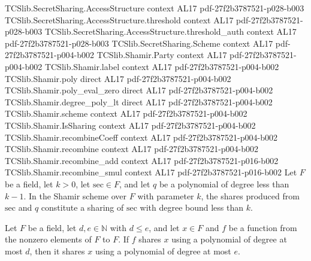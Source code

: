 \begin{theorem}
\label{TCSlib.Shamir.isSharing_share}
\leanok
\proofstep
  {TCSlib.SecretSharing.AccessStructure}
  {context}
  {AL17}
  {pdf-27f2b3787521-p028-b003}
\proofstep
  {TCSlib.SecretSharing.AccessStructure.threshold}
  {context}
  {AL17}
  {pdf-27f2b3787521-p028-b003}
\proofstep
  {TCSlib.SecretSharing.AccessStructure.threshold_auth}
  {context}
  {AL17}
  {pdf-27f2b3787521-p028-b003}
\proofstep
  {TCSlib.SecretSharing.Scheme}
  {context}
  {AL17}
  {pdf-27f2b3787521-p004-b002}
\proofstep
  {TCSlib.Shamir.Party}
  {context}
  {AL17}
  {pdf-27f2b3787521-p004-b002}
\proofstep
  {TCSlib.Shamir.label}
  {context}
  {AL17}
  {pdf-27f2b3787521-p004-b002}
\proofstep
  {TCSlib.Shamir.poly}
  {direct}
  {AL17}
  {pdf-27f2b3787521-p004-b002}
\proofstep
  {TCSlib.Shamir.poly_eval_zero}
  {direct}
  {AL17}
  {pdf-27f2b3787521-p004-b002}
\proofstep
  {TCSlib.Shamir.degree_poly_lt}
  {direct}
  {AL17}
  {pdf-27f2b3787521-p004-b002}
\proofstep
  {TCSlib.Shamir.scheme}
  {context}
  {AL17}
  {pdf-27f2b3787521-p004-b002}
\proofstep
  {TCSlib.Shamir.IsSharing}
  {context}
  {AL17}
  {pdf-27f2b3787521-p004-b002}
\proofstep
  {TCSlib.Shamir.recombineCoeff}
  {context}
  {AL17}
  {pdf-27f2b3787521-p004-b002}
\proofstep
  {TCSlib.Shamir.recombine}
  {context}
  {AL17}
  {pdf-27f2b3787521-p004-b002}
\proofstep
  {TCSlib.Shamir.recombine_add}
  {context}
  {AL17}
  {pdf-27f2b3787521-p016-b002}
\proofstep
  {TCSlib.Shamir.recombine_smul}
  {context}
  {AL17}
  {pdf-27f2b3787521-p016-b002}
Let $F$ be a field, let $k>0$, let $\mathrm{sec}\in F$, and let $q$ be a polynomial of
degree less than $k-1$. In the Shamir scheme over $F$ with parameter $k$, the shares
produced from $\mathrm{sec}$ and $q$ constitute a sharing of $\mathrm{sec}$ with degree
bound less than $k$.
\end{theorem}

\begin{theorem}
\label{TCSlib.Shamir.IsSharing.mono}
\leanok
{}
Let $F$ be a field, let $d,e\in\mathbb N$ with $d\le e$, and let $x\in F$ and $f$ be a
function from the nonzero elements of $F$ to $F$. If $f$ shares $x$ using a polynomial
of degree at most $d$, then it shares $x$ using a polynomial of degree at most $e$.
\end{theorem}

